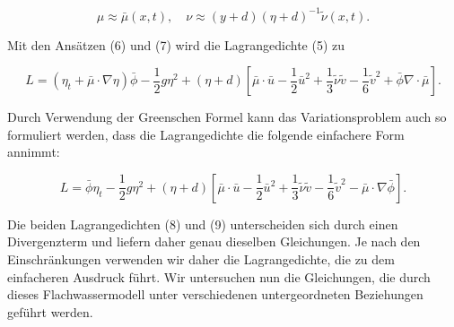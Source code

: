 \[ \mu \approx \bar{\mu}(x, t), \quad \nu \approx (y + d) (\eta + d)^{-1} \tilde{\nu}(x, t). \]

Mit den Ansätzen (6) und (7) wird die Lagrangedichte (5) zu

\[ L = (\eta_t + \bar{\mu} \cdot \nabla \eta) \bar{\phi} - \frac{1}{2} g \eta^2 + (\eta + d) [\bar{\mu} \cdot \bar{u} - \frac{1}{2} \bar{u}^2 + \frac{1}{3} \tilde{\nu} \tilde{v} - \frac{1}{6} \tilde{v}^2 + \bar{\phi} \nabla \cdot \bar{\mu}]. \]

Durch Verwendung der Greenschen Formel kann das Variationsproblem auch so formuliert werden, dass die Lagrangedichte die folgende einfachere Form annimmt:

\[ L = \bar{\phi} \eta_t - \frac{1}{2} g \eta^2 + (\eta + d) [\bar{\mu} \cdot \bar{u} - \frac{1}{2} \bar{u}^2 + \frac{1}{3} \tilde{\nu} \tilde{v} - \frac{1}{6} \tilde{v}^2 - \bar{\mu} \cdot \nabla \bar{\phi}]. \]

Die beiden Lagrangedichten (8) und (9) unterscheiden sich durch einen Divergenzterm und liefern daher genau dieselben Gleichungen. Je nach den Einschränkungen verwenden wir daher die Lagrangedichte, die zu dem einfacheren Ausdruck führt. Wir untersuchen nun die Gleichungen, die durch dieses Flachwassermodell unter verschiedenen untergeordneten Beziehungen geführt werden.
